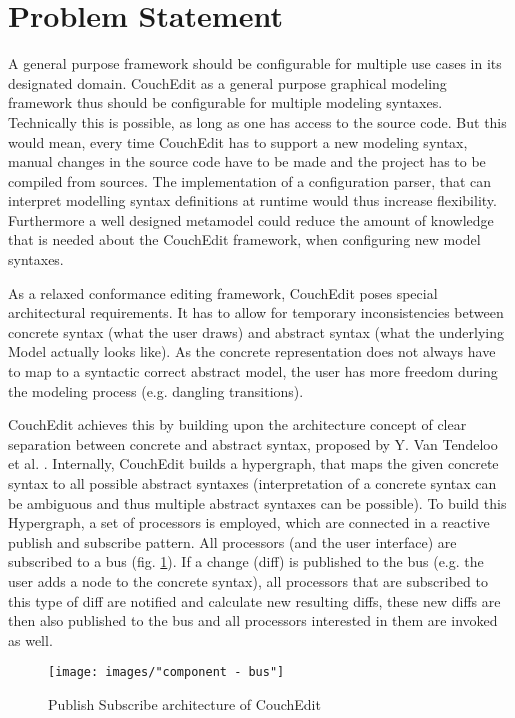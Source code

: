 \section{Problem Statement}
\label{sec:problem_statement}

A general purpose framework should be configurable for multiple use cases in its designated domain. CouchEdit as a general purpose graphical modeling framework thus should be configurable for multiple modeling syntaxes. Technically this is possible, as long as one has access to the source code. But this would mean, every time CouchEdit has to support a new modeling syntax, manual changes in the source code have to be made and the project has to be compiled from sources. The implementation of a configuration parser, that can interpret modelling syntax definitions at runtime would thus increase flexibility. Furthermore a well designed metamodel could reduce the amount of knowledge that is needed about the CouchEdit framework, when configuring new model syntaxes.

As a relaxed conformance editing framework, CouchEdit poses special architectural requirements. It has to allow for temporary inconsistencies between concrete syntax (what the user draws) and abstract syntax (what the underlying Model actually looks like). As the concrete representation does not always have to map to a syntactic correct abstract model, the user has more freedom during the modeling process (e.g. dangling transitions).

CouchEdit achieves this by building upon the architecture concept of clear separation between concrete and abstract syntax, proposed by Y. Van Tendeloo et al. \cite{van_tendeloo_concrete_2017}. Internally, CouchEdit builds a hypergraph, that maps the given concrete syntax to all possible abstract syntaxes (interpretation of a concrete syntax can be ambiguous and thus multiple abstract syntaxes can be possible). To build this Hypergraph, a set of processors is employed, which are connected in a reactive publish and subscribe pattern. All processors (and the user interface) are subscribed to a bus (fig. \ref{fig:processors}). If a change (diff) is published to the bus (e.g. the user adds a node to the concrete syntax), all processors that are subscribed to this type of diff are notified and calculate new resulting diffs, these new diffs are then also published to the bus and all processors interested in them are invoked as well.

\begin{figure}
  \centering
  \texttt{[image: images/"component - bus"]}
  \caption{Publish Subscribe architecture of CouchEdit}
  \label{fig:processors}
\end{figure}

